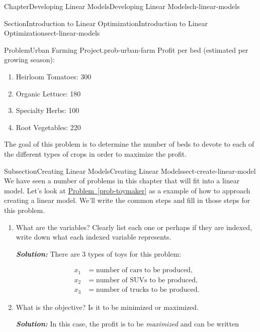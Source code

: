 \documentclass[oneside,10pt,]{book}
\newcommand{\xreffont}{\relax}
\newcommand{\alert}[1]{\textbf{\textit{#1}}}
\numberwithin{equation}{section}
\newcommand{\amp}{&}
\begin{document}
\begin{chapterptx}{Chapter}{Developing Linear Models}{}{Developing Linear Models}{}{}{ch-linear-models}
\begin{sectionptx}{Section}{Introduction to Linear Optimization}{}{Introduction to Linear Optimization}{}{}{sect-linear-models}
\begin{introduction}{}
\begin{problem}{Problem}{Urban Farming Project.}{prob-urban-farm}
Profit per bed (estimated per growing season):%
\par
%
\begin{enumerate}
\item{}Heirloom Tomatoes: \textdollar{}300%
\item{}Organic Lettuce: \textdollar{}180%
\item{}Specialty Herbs: \textdollar{}100%
\item{}Root Vegetables: \textdollar{}220%
\end{enumerate}
%
\par
The goal of this problem is to determine the number of beds to devote to each of the different types of crops in order to maximize the profit.%
\end{problem}
%
\end{introduction}%
%
%
\typeout{************************************************}
\typeout{************************************************}
%
\begin{subsectionptx}{Subsection}{Creating Linear Models}{}{Creating Linear Models}{}{}{sect-create-linear-model}
We have seen a number of problems in this chapter that will fit into a linear model. Let's look at \hyperref[prob-toymaker]{Problem~{\xreffont\ref{prob-toymaker}}} as a example of how to approach creating a linear model. We'll write the common steps and fill in those steps for this problem.%
\par
%
\begin{enumerate}
\item{}What are the variables? Clearly list each one or perhaps if they are indexed, write down what each indexed variable represents.%
\par
\alert{Solution:} There are 3 types of toys for this problem:%
\par
%
\begin{align*}
x_1 \amp = \text{number of cars to be produced},\\
x_2 \amp = \text{number of SUVs to be produced},\\
x_3 \amp = \text{number of trucks to be produced}.
\end{align*}
%
\item{}What is the objective?   Is it to be minimized or maximized.%
\par
\alert{Solution:} In this case, the profit is to be \emph{maximized} and can be written%
\par

\end{enumerate}
\end{subsectionptx}
\end{sectionptx}
\end{chapterptx}
\end{document}
